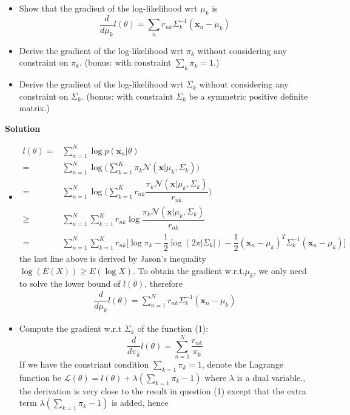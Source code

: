 \documentclass[12pt]{article}%
\begin{document}
\begin{itemize}
	
	\item Show that the gradient of the log-likelihood wrt $\mu_k$ is
	\[ \frac{d}{d\mu_k}l(\theta) = \sum_n r_{nk}\Sigma_k^{-1}(\mathbf{x}_n-\mu_k)
	\]
    \item Derive the gradient of the log-likelihood wrt $\pi_k$ without considering any constraint on $\pi_k$. (bonus: with constraint $\sum_k\pi_k=1$.)
    \item Derive the gradient of the log-likelihood wrt $\Sigma_k$ without considering any constraint on $\Sigma_k$. (bonus: with constraint $\Sigma_k$ be a symmetric positive definite matrix.) 
	
\end{itemize}
\textbf{Solution}
\begin{itemize}
	\item 
	\begin{align*}
	l(\theta)=&\sum_{n=1}^N \log p(\mathbf{x}_n|\theta)\\
	=&\sum_{n=1}^N\log \Big( \sum_{k=1}^{K} \pi_{k} \mathcal{N}(\mathbf{x}|\mu_k,\Sigma_k)\Big)\\
	=&\sum_{n=1}^N\log \Big( \sum_{k=1}^{K} r_{nk}\dfrac{\pi_{k} \mathcal{N}(\mathbf{x}|\mu_k,\Sigma_k)}{r_{nk}}\Big)\\
	\ge&\sum_{n=1}^N\sum_{k=1}^Kr_{nk}\log\dfrac{\pi_{k} \mathcal{N}(\mathbf{x}|\mu_k,\Sigma_k)}{r_{nk}}\\
	=&\sum_{n=1}^N\sum_{k=1}^K r_{nk}\Big[\log\pi_k-\dfrac{1}{2}\log(2\pi|\Sigma_k|)-\dfrac{1}{2}(\mathbf{x}_n-\mu_k)^T\Sigma_k^{-1}(\mathbf{x}_n-\mu_k)\Big] \tag{1}
	\end{align*}
	the last line above is derived by Jason's inequality $ \log(E(X))\ge E(\log X) $. To obtain the gradient w.r.t.$ \mu_k $, we only need to solve the lower bound of $ l(\theta) $, therefore
	\begin{align*}
	\dfrac{d}{d\mu_k}l(\theta)=\sum_{n=1}^Nr_{nk}\Sigma_k^{-1}(\mathbf{x}_n-\mu_k)
	\end{align*} 
	\item Compute the gradient w.r.t $ \Sigma_k $  of the function (1):
	\[ \dfrac{d}{d\pi_k}l(\theta)=\sum_{n=1}^N\dfrac{r_{nk}}{\pi_k} \]
	If we have the constriant condition $ \sum_{k=1}\pi_k=1 $, denote the Lagrange function be $ \mathcal L(\theta)=l(\theta)+\lambda(\sum_{k=1}\pi_k-1) $ where $ \lambda $ is a dual variable., the derivation is very close to the result in question (1) except that the extra term $ \lambda(\sum_{k=1}\pi_k-1) $ is added, hence

\end{itemize}
\end{document}
